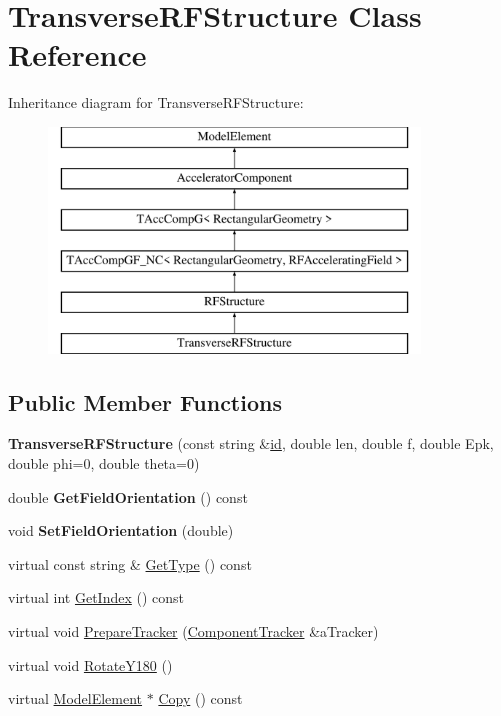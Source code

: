 \hypertarget{classTransverseRFStructure}{}\section{Transverse\+R\+F\+Structure Class Reference}
\label{classTransverseRFStructure}
Inheritance diagram for Transverse\+R\+F\+Structure\+:\begin{figure}[H]
\begin{center}
\leavevmode
\includegraphics[height=6.000000cm]{classTransverseRFStructure}
\end{center}
\end{figure}
\subsection*{Public Member Functions}
\begin{DoxyCompactItemize}
\item 
\mbox{\label{classTransverseRFStructure_a12d4bab955f848bd33cd221d2d395d3e}} 
{\bfseries Transverse\+R\+F\+Structure} (const string \&\hyperlink{classModelElement_aada171ead2085c75b592cf07d91bc5c2}{id}, double len, double f, double Epk, double phi=0, double theta=0)
\item 
\mbox{\label{classTransverseRFStructure_a1763ac780fc775e254e4e72e9f3d2692}} 
double {\bfseries Get\+Field\+Orientation} () const
\item 
\mbox{\label{classTransverseRFStructure_a247be9e9850b88403f9f0c498b7397c6}} 
void {\bfseries Set\+Field\+Orientation} (double)
\item 
virtual const string \& \hyperlink{classTransverseRFStructure_a3dbe71ac560ebc89a02d869d3dd7999d}{Get\+Type} () const
\item 
virtual int \hyperlink{classTransverseRFStructure_ab19fe781495285c2b088da81fe3ccff0}{Get\+Index} () const
\item 
virtual void \hyperlink{classTransverseRFStructure_aa06fabec5aff45f5ac71c5a29f70ca3c}{Prepare\+Tracker} (\hyperlink{classComponentTracker}{Component\+Tracker} \&a\+Tracker)
\item 
virtual void \hyperlink{classTransverseRFStructure_a1b016853604d6d2f1c21af600ff52fe0}{Rotate\+Y180} ()
\item 
virtual \hyperlink{classModelElement}{Model\+Element} $\ast$ \hyperlink{classTransverseRFStructure_a834a1ab102f7173c459a4e801f28e25b}{Copy} () const
\end{DoxyCompactItemize}
